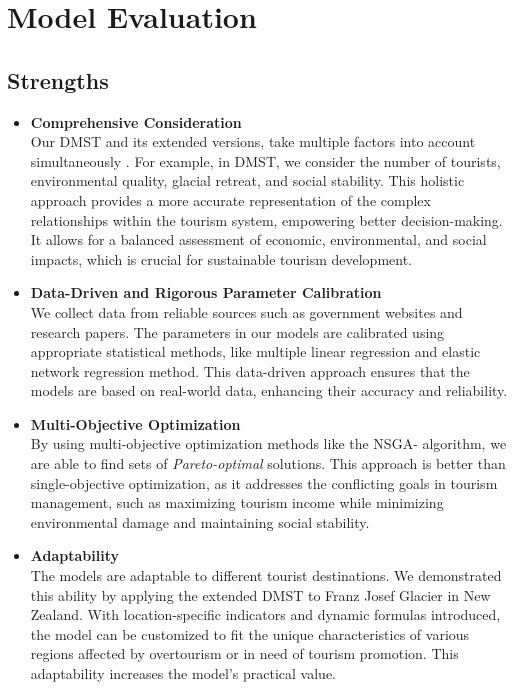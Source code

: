 \documentclass{mcmthesis}
\begin{document}
\section{Model Evaluation}
\subsection{Strengths}
\begin{itemize}
 \item \textbf{Comprehensive Consideration} \\
 Our DMST and its extended versions, take multiple factors into account simultaneously . 
 For example, in DMST, we consider the number of tourists, environmental quality, glacial retreat, and social stability. 
 This holistic approach provides a more accurate representation of the complex relationships within the tourism system, 
 empowering better decision-making. It allows for a balanced assessment of economic, environmental, and social impacts, 
 which is crucial for sustainable tourism development.
 \item \textbf{Data-Driven and Rigorous Parameter Calibration} \\
 We collect data from reliable sources such as government websites and research papers.
 The parameters in our models are calibrated using appropriate statistical methods, like multiple linear regression and elastic network regression method.
 This data-driven approach ensures that the models are based on real-world data, enhancing their accuracy and reliability.
 \item \textbf{Multi-Objective Optimization} \\
 By using multi-objective optimization methods like the NSGA-\uppercase\expandafter{} algorithm,
 we are able to find sets of \emph{Pareto-optimal} solutions. This approach is better than single-objective optimization, 
 as it addresses the conflicting goals in tourism management, such as maximizing tourism income while minimizing environmental damage and maintaining social stability.
 \item \textbf{Adaptability} \\
 The models are adaptable to different tourist destinations.
 We demonstrated this ability by applying the extended DMST to Franz Josef Glacier in New Zealand.
 With location-specific indicators and dynamic formulas introduced, the model can be customized to fit the unique characteristics of various regions affected by overtourism or in need of tourism promotion.
 This adaptability increases the model's practical value.
\end{itemize}
\end{document}
